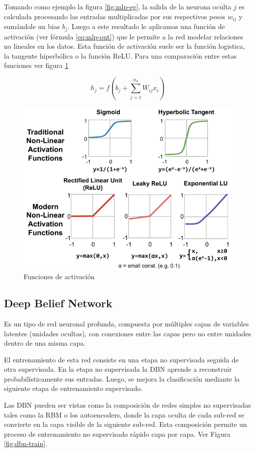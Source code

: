 Tomando como ejemplo la figura \ref{fig:mlp-eg}, la salida de la neurona oculta $j$ es calculada procesando las entradas multiplicadas por sus respectivos pesos $w_{ij}$ y sumándole un bias $b_j$. Luego a este resultado le aplicamos una función de activación (ver fórmula \ref{eq:mlp-out}) que le permite a la red modelar relaciones no lineales en los datos. Esta función de activación suele ser la función logistica, la tangente hiperbólica o la función \ac{ReLU}. Para una comparación entre estas funciones ver figura \ref{fig:mlp-activation}

\begin{equation}
    \label{eq:mlp-out}
    h_j = f(b_j + \sum_{j=1}^{n_h} W_{ij} x_i)
\end{equation}

\begin{figure}
    \centering
    \caption{Funciones de activación}
    \label{fig:mlp-activation}
    \includegraphics[width=0.6\linewidth]{graficos/mlp_activation_functions.png}
\end{figure}

\subsection{Deep Belief Network}

Es un tipo de red neuronal profunda, compuesta por múltiples capas de variables latentes (unidades ocultas), con conexiones entre las capas pero no entre unidades dentro de una misma capa.

El entrenamiento de esta red consiste en una etapa no supervisada seguida de otra supervisada. En la etapa no supervisada la \ac{DBN} aprende a reconstruir probabilísticamente sus entradas. Luego, se mejora la clasificación mediante la siguiente etapa de entrenamiento supervisado.

Las \ac{DBN} pueden ser vistas como la composición de redes simples no supervisadas tales como la \ac{RBM} o los autoencoders, donde la capa oculta de cada sub-red se convierte en la capa visible de la siguiente sub-red. Esta composición permite un proceso de entrenamiento no supervisado rápido capa por capa. Ver Figura \ref{fig:dbn-train}.

